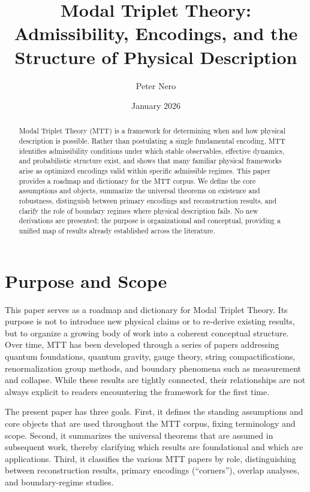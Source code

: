\documentclass[11pt]{article}
\title{Modal Triplet Theory:\\
Admissibility, Encodings, and the Structure of Physical Description}
\author{Peter Nero}
\date{January 2026}
\begin{document}
\maketitle

\begin{abstract}
Modal Triplet Theory (MTT) is a framework for determining when and how physical description is possible. Rather than postulating a single fundamental encoding, MTT identifies admissibility conditions under which stable observables, effective dynamics, and probabilistic structure exist, and shows that many familiar physical frameworks arise as optimized encodings valid within specific admissible regimes. This paper provides a roadmap and dictionary for the MTT corpus. We define the core assumptions and objects, summarize the universal theorems on existence and robustness, distinguish between primary encodings and reconstruction results, and clarify the role of boundary regimes where physical description fails. No new derivations are presented; the purpose is organizational and conceptual, providing a unified map of results already established across the literature.
\end{abstract}

\tableofcontents

\section{Purpose and Scope}

This paper serves as a roadmap and dictionary for Modal Triplet Theory. Its purpose is not to introduce new physical claims or to re-derive existing results, but to organize a growing body of work into a coherent conceptual structure. Over time, MTT has been developed through a series of papers addressing quantum foundations, quantum gravity, gauge theory, string compactifications, renormalization group methods, and boundary phenomena such as measurement and collapse. While these results are tightly connected, their relationships are not always explicit to readers encountering the framework for the first time.

The present paper has three goals. First, it defines the standing assumptions and core objects that are used throughout the MTT corpus, fixing terminology and scope. Second, it summarizes the universal theorems that are assumed in subsequent work, thereby clarifying which results are foundational and which are applications. Third, it classifies the various MTT papers by role, distinguishing between reconstruction results, primary encodings (“corners”), overlap analyses, and boundary-regime studies.
\end{document}
